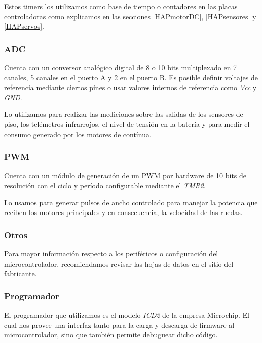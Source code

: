 Estos timers los utilizamos como base de tiempo o contadores en las placas controladoras como explicamos en las secciones \ref{HAPmotorDC},
\ref{HAPsensores} y \ref{HAPservos}.

\subsubsection{ADC}
\label{adc}

Cuenta con un conversor anal\'ogico digital de 8 o 10 bits multiplexado en 7 canales, 5 canales en el puerto A y 2 en el puerto B.
Es posible definir voltajes de referencia mediante ciertos pines o usar valores internos de referencia como \emph{Vcc} y \emph{GND}.

Lo utilizamos para realizar las mediciones sobre las salidas de los sensores de piso, los tel\'emetros infrarrojos, el nivel de tensi\'on en la bater\'ia
y para medir el consumo generado por los motores de cont\'inua.

\subsubsection{PWM}
\label{pwm}

Cuenta con un m\'odulo de generaci\'on de un PWM por hardware de 10 bits de resoluci\'on con el ciclo y per\'iodo configurable mediante el \emph{TMR2}.

Lo usamos para generar pulsos de ancho controlado para manejar la potencia que reciben los motores principales y en consecuencia, la velocidad de las ruedas.

\subsubsection{Otros}
\label{otros}

Para mayor informaci\'on respecto a los perif\'ericos o configuraci\'on del microcontrolador, recomiendamos revisar las hojas de datos en el sitio del fabricante.

\subsubsection{Programador}
\label{HMprogramador}

El programador que utilizamos es el modelo \emph{ICD2} de la empresa Microchip. El cual nos provee una interfaz tanto para la carga y descarga
de firmware al microcontrolador, sino que tambi\'en permite debuguear dicho c\'odigo.


